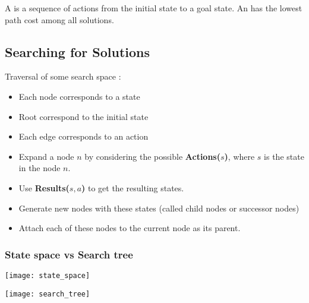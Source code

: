 A  is a sequence of actions from the initial state to a goal state.
An  has the lowest path cost among all solutions.

\subsection{Searching for Solutions}

Traversal of some search space :
\begin{itemize}
\item Each node corresponds to a state
\item Root correspond to the initial state
\item Each edge corresponds to an action
\end{itemize}

\begin{itemize}
\item Expand a node $n$ by considering the possible \textbf{Actions($s$)}, where $s$ is the state in the node $n$.
\item Use \textbf{Results($s, a$)} to get the resulting states.
\item Generate new nodes with these states (called child nodes or successor nodes)
\item Attach each of these nodes to the current node as its parent.
\end{itemize}

\subsubsection{State space vs Search tree}

\begin{Parallel}[v]{0.48\textwidth}{0.48\textwidth}
\ParallelPar
\end{Parallel}

\begin{minipage}{0.48\textwidth}
  \centering
  \texttt{[image: state\_space]}
\end{minipage}
\begin{minipage}{0.48\textwidth}
  \centering
  \texttt{[image: search\_tree]}
\end{minipage}

